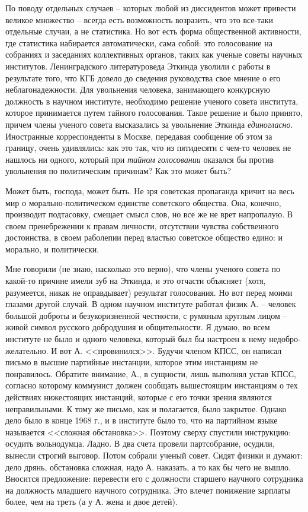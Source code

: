 \documentclass{book}
\begin{document}
По поводу отдельных случаев -- которых любой из диссидентов может привести великое множество -- всегда есть возможность возразить, что это все-таки отдельные случаи, а не статистика. Но вот есть форма общественной активности, где статистика набирается автоматически, сама собой: это голосование на собраниях и заседаниях коллективных органов, таких как ученые советы научных институтов. Ленинградского литературоведа Эткинда уволили с работы в результате того, что КГБ довело до сведения руководства свое мнение о его неблагонадежности. Для увольнения человека, занимающего конкурсную должность в научном институте, необходимо решение ученого совета института, которое принимается путем тайного голосования. Такое решение и было принято, причем члены ученого совета высказались за увольнение Эткинда \textit{единогласно}.  Иностранные корреспонденты в Москве, передавая сообщение об этом за границу, очень удивлялись: как это так, что из пятидесяти с чем-то человек не нашлось ни одного, кото­рый при \textit{тайном голосовании}  оказался бы против увольнения по политическим причинам? Как это может быть?

Может быть, господа, может быть. Не зря советская пропа­ганда кричит на весь мир о морально-политическом единстве советского общества. Она, конечно, производит подтасовку, смещает смысл слов, но все же не врет напропалую. В своем пренебрежении к правам личности, отсутствии чувства собст­венного достоинства, в своем раболепии перед властью совет­ское общество едино: и морально, и политически.

Мне говорили (не знаю, насколько это верно), что члены ученого совета по какой-то причине имели зуб на Эткинда, и это отчасти объясняет (хотя, разумеется, никак не оправды­вает) результат голосования. Но вот перед моими глазами другой случай. В одном научном институте работал физик А. -- человек большой доброты и безукоризненной честности, с ру­мяным круглым лицом -- живой символ русского доброду­шия и общительности. Я думаю, во всем институте не было и одного человека, который был бы настроен к нему недобро­желательно. И вот А. <<провинился>>. Будучи членом КПСС, он написал письмо в высшие партийные инстанции, которое этим инстанциям не понравилось. Обратите внимание, А., в сущ­ности, лишь выполнял устав КПСС, согласно которому комму­нист должен сообщать вышестоящим инстанциям о тех дейст­виях нижестоящих инстанций, которые с его точки зрения являются неправильными. К тому же письмо, как и полагает­ся, было закрытое. Однако дело было в конце 1968 г., и в институте было то, что на партийном языке называется <<слож­ная обстановка>>. Поэтому сверху спустили инструкцию: осу­дить вольнодумца. Ладно. В два счета провели партсобрание, осудили, вынесли строгий выговор. Потом собрали ученый со­вет. Сидят физики и думают: дело дрянь, обстановка сложная, надо А. наказать, а то как бы чего не вышло. Вносится предло­жение: перевести его с должности старшего научного сотруд­ника на должность младшего научного сотрудника. Это вле­чет понижение зарплаты более, чем на треть (а у А. жена и двое детей).
\end{document}
